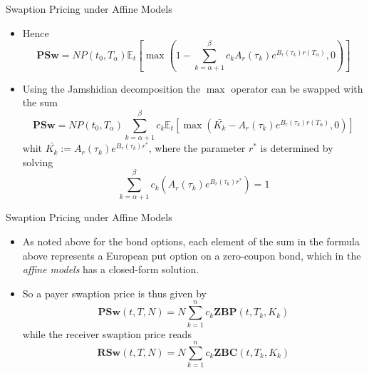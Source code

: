 \documentclass{beamer}
\begin{document}
\begin{frame}{Swaption Pricing under Affine Models}
\begin{itemize}
\item Hence
\begin{equation*}
\textbf{PSw}=NP(t_0, T_\alpha)\mathbb{E}_t\left[\max\left(1-\sum_{k=\alpha+1}^\beta c_k A_r(\tau_k)e^{B_r(\tau_k)r(T_\alpha)}, 0\right)\right]
\end{equation*}
	\item Using the Jamshidian decomposition the $\max$ operator can be swapped with the sum
\begin{equation*}
\textbf{PSw}=NP(t_0, T_\alpha)\sum_{k=\alpha+1}^\beta c_k \mathbb{E}_t\left[\max\left(\bar{K_k} - A_r(\tau_k)e^{B_r(\tau_k)r(T_\alpha)}, 0\right)\right]
\end{equation*}
whit $\bar{K_k} := A_r(\tau_k)e^{B_r(\tau_k)r^{*}}$, where the parameter $r^{*}$ is determined by solving
\begin{equation*}
\sum_{k=\alpha+1}^\beta c_k \left(A_r(\tau_k)e^{B_r(\tau_k)r^{*}}\right) = 1
\end{equation*}
\end{itemize}
\end{frame}

\begin{frame}{Swaption Pricing under Affine Models}
\begin{itemize}
\item As noted above for the bond options, each element of the sum in the formula above represents a European put option on a zero-coupon bond, which in the \emph{affine models} has a closed-form solution.
\item So a payer swaption price is thus given by
	\begin{equation}
		\boxed{\textbf{PSw}(t,T,N) = N\sum_{k=1}^n c_k \textbf{ZBP}(t,T_k,K_k)}
	\end{equation}
	while the receiver swaption price reads
	\begin{equation}
		\boxed{\textbf{RSw}(t,T,N) = N\sum_{k=1}^n c_k \textbf{ZBC}(t,T_k,K_k)}
	\end{equation}
\end{itemize}	
\end{frame}
\end{document}
